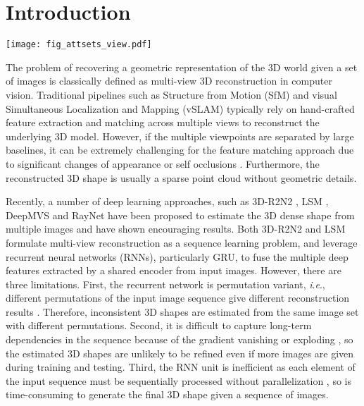 \documentclass[twocolumn]{svjour3}    \pdfoutput=1
\newcommand{\faset}{FASet}
\newcommand{\ie}{\textit{i}.\textit{e}., }
\begin{document}
\section{Introduction}
\begin{figure*}[t]
\centering
   \texttt{[image: fig\_attsets\_view.pdf]}
\caption{Overview of our attentional aggregation module for multi-view 3D reconstruction. A set of  images is passed through a common encoder to be a set of deep features, one element for each image. The network is trained with our \faset{} algorithm.}
\label{fig:attsets_view}
\vspace{-0.25cm}
\end{figure*}

The problem of recovering a geometric representation of the 3D world given a set of images is classically defined as multi-view 3D reconstruction in computer vision. Traditional pipelines such as Structure from Motion (SfM) \citep{Ozyesil2017} and visual Simultaneous Localization and Mapping (vSLAM) \citep{Cadena2016} typically rely on hand-crafted feature extraction and matching across multiple views to reconstruct the underlying 3D model. However, if the multiple viewpoints are separated by large baselines, it can be extremely challenging for the feature matching approach due to significant changes of appearance or self occlusions \citep{Lowe2004}. Furthermore, the reconstructed 3D shape is usually a sparse point cloud without geometric details.

Recently, a number of deep learning approaches, such as 3D-R2N2 \citep{Chan2016}, LSM \citep{Kar2017}, DeepMVS \citep{Huang2018} and RayNet \citep{Paschalidou2018} have been proposed to estimate the 3D dense shape from multiple images and have shown encouraging results. Both 3D-R2N2 \citep{Chan2016} and LSM \citep{Kar2017} formulate multi-view reconstruction as a sequence learning problem, and leverage recurrent neural networks (RNNs), particularly GRU, to fuse the multiple deep features extracted by a shared encoder from input images. However, there are three limitations. First, the recurrent network is permutation variant, \ie different permutations of the input image sequence give different reconstruction results \citep{Vinyals2016a}.
Therefore, inconsistent 3D shapes are estimated from the same image set with different permutations. Second, it is difficult to capture long-term dependencies in the sequence because of the gradient vanishing or exploding \citep{Bengio1994,Kolen2001}, so the estimated 3D shapes are unlikely to be refined even if more images are given during training and testing. Third, the RNN unit is inefficient as each element of the input sequence must be sequentially processed without parallelization \citep{Martin2018}, so is time-consuming to generate the final 3D shape given a sequence of images. 
\end{document}
